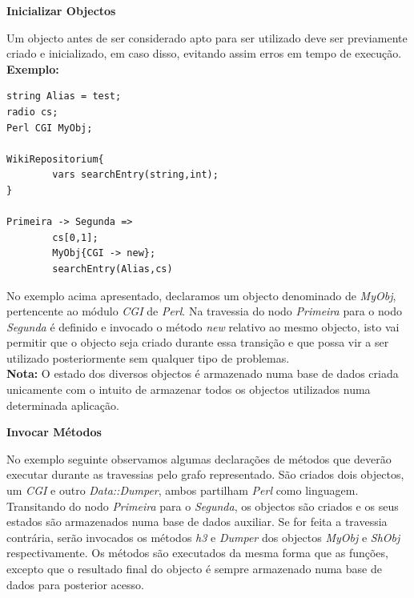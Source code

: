 \documentclass[a4paper]{article}
\begin{document}
\begin{small}
\textbf{Inicializar Objectos}\\
\end{small}

\hspace{1cm}Um objecto antes de ser considerado apto para ser utilizado deve ser previamente criado e inicializado, em caso disso,
evitando assim erros em tempo de execução.\\

\textbf{Exemplo:}

\begin{small}
\begin{lstlisting}
string Alias = test;
radio cs;
Perl CGI MyObj;

WikiRepositorium{
        vars searchEntry(string,int);
}

Primeira -> Segunda =>
        cs[0,1];
        MyObj{CGI -> new};
        searchEntry(Alias,cs)
\end{lstlisting}
\end{small}

\vspace{.2cm}

No exemplo acima apresentado, declaramos um objecto denominado de \emph{MyObj}, pertencente ao módulo \emph{CGI} de \emph{Perl}.
Na travessia do nodo \emph{Primeira} para o nodo \emph{Segunda} é definido e invocado o método \emph{new} relativo ao mesmo objecto, isto
vai permitir que o objecto seja criado durante essa transição e que possa vir a ser utilizado posteriormente sem qualquer tipo de
problemas.\\

\textbf{Nota:} O estado dos diversos objectos é armazenado numa base de dados criada unicamente com o intuito de armazenar todos os
objectos utilizados numa determinada aplicação.\\

\begin{small}
\textbf{Invocar Métodos}\\
\end{small}

\hspace{1cm}No exemplo seguinte observamos algumas declarações de métodos que deverão executar durante as travessias pelo grafo
representado. São criados dois objectos, um \emph{CGI} e outro \emph{Data::Dumper}, ambos partilham \emph{Perl} como linguagem.
Transitando do nodo \emph{Primeira} para o \emph{Segunda}, os objectos são criados e os seus estados são armazenados numa base de dados
auxiliar. Se for feita a travessia contrária, serão invocados os métodos \emph{h3} e \emph{Dumper} dos objectos \emph{MyObj} e
\emph{ShObj} respectivamente. Os métodos são executados da mesma forma que as funções, excepto que o resultado final do objecto é
sempre armazenado numa base de dados para posterior acesso.\\
\end{document}

